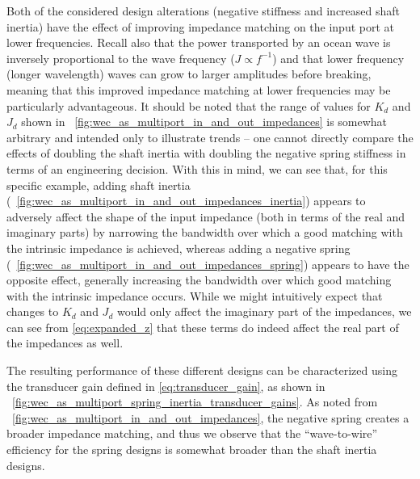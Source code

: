 \documentclass[lettersize,journal]{IEEEtran}
\begin{document}
Both of the considered design alterations (negative stiffness and increased shaft inertia) have the effect of improving impedance matching on the input port at lower frequencies.
Recall also that the power transported by an ocean wave is inversely proportional to the wave frequency ($J \propto f^{-1}$) and that lower frequency (longer wavelength) waves can grow to larger amplitudes before breaking, meaning that this improved impedance matching at lower frequencies may be particularly advantageous.
It should be noted that the range of values for $K_d$ and $J_d$ shown in \figurename~\ref{fig:wec_as_multiport_in_and_out_impedances} is somewhat arbitrary and intended only to illustrate trends -- one cannot directly compare the effects of doubling the shaft inertia with doubling the negative spring stiffness in terms of an engineering decision.
With this in mind, we can see that, for this specific example, adding shaft inertia (\figurename~\ref{fig:wec_as_multiport_in_and_out_impedances_inertia}) appears to adversely affect the shape of the input impedance (both in terms of the real and imaginary parts) by narrowing the bandwidth over which a good matching with the intrinsic impedance is achieved, whereas adding a negative spring (\figurename~\ref{fig:wec_as_multiport_in_and_out_impedances_spring}) appears to have the opposite effect, generally increasing the bandwidth over which good matching with the intrinsic impedance occurs.
While we might intuitively expect that changes to $K_d$ and $J_d$ would only affect the imaginary part of the impedances, we can see from \eqref{eq:expanded_z} that these terms do indeed affect the real part of the impedances as well.

The resulting performance of these different designs can be characterized using the transducer gain defined in \eqref{eq:transducer_gain}, as shown in \figurename~\ref{fig:wec_as_multiport_spring_inertia_transducer_gains}.
As noted from \figurename~\ref{fig:wec_as_multiport_in_and_out_impedances}, the negative spring creates a broader impedance matching, and thus we observe that the ``wave-to-wire'' efficiency for the spring designs is somewhat broader than the shaft inertia designs.
\end{document}
